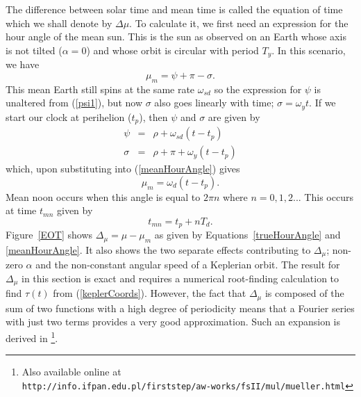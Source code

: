 \documentclass[12pt]{article}
\newcommand{\nn}{\nonumber}
\newcommand{\omy}{\omega_y}
\newcommand{\omd}{\omega_d}
\newcommand{\omsd}{\omega_{sd}}
\begin{document}
The difference between solar time and mean time is called the equation of time which we shall denote by $\Delta\mu$. To calculate it, we first need an expression for the hour angle of the mean sun. This is the sun as observed on an Earth whose axis is not tilted ($\alpha = 0$) and whose orbit is circular with period $T_y$. In this scenario, we have
%
\begin{equation} \label{meanHourAngle}
\mu_m = \psi + \pi - \sigma.
\end{equation}
%
This mean Earth still spins at the same rate $\omsd$ so the expression for $\psi$ is unaltered from (\ref{psi1}), but now $\sigma$ also goes linearly with time; $\sigma = \omy t $. If we start our clock at perihelion ($t_p$), then $\psi$ and $\sigma$ are given by
%
\begin{eqnarray}
\psi & = & \rho + \omsd (t - t_p) \\ \nn
\sigma & = & \rho + \pi + \omy (t - t_p)
\end{eqnarray}
%
which, upon substituting into (\ref{meanHourAngle}) gives
%
\begin{equation}
\mu_m = \omd (t - t_p).
\end{equation}
%
Mean noon occurs when this angle is equal to $2\pi n$ where $n=0,1,2..$. This occurs at time $t_{mn}$ given by
%
\begin{equation}
t_{mn} = t_p + n T_d.
\end{equation}
%
Figure~\ref{EOT} shows $\Delta_\mu = \mu - \mu_m$ as given by Equations~\ref{trueHourAngle} and \ref{meanHourAngle}. It also shows the two separate effects contributing to $\Delta_\mu$; non-zero $\alpha$ and the non-constant angular speed of a Keplerian orbit. The result for $\Delta_\mu$ in this section is exact and requires a numerical root-finding calculation to find $\tau(t)$ from (\ref{keplerCoords}). However, the fact that $\Delta_\mu$ is composed of the sum of two functions with a high degree of periodicity means that a Fourier series with just two terms provides a very good approximation. Such an expansion is derived in \cite{mueller}\footnote{Also available online at\\ {\tt http://info.ifpan.edu.pl/firststep/aw-works/fsII/mul/mueller.html}}.
%
\end{document}
